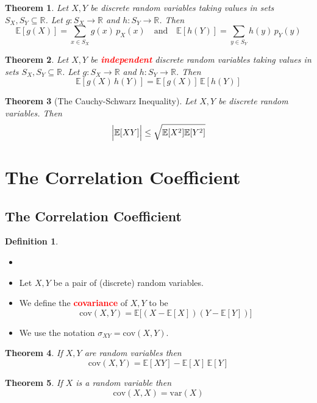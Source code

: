 \documentclass{article}
\newcommand{\R}{\mathbb{R}}
\newcommand{\E}{\mathbb{E}}
\newcommand{\var}{\text{var}}
\newcommand{\cov}{\text{cov}}
\newcommand{\bfred}[1]{\textcolor{red}{\textbf{#1}}}
\theoremstyle{plain}
\newtheorem{thm}{Theorem}[section]
\theoremstyle{definition}
\newtheorem{defn}{Definition}[section]
\theoremstyle{remark}
\begin{document}
\begin{thm}
    Let $X,Y$ be discrete random variables taking values in sets $S_X,S_Y\subseteq\R$. Let $g:S_X\rightarrow\R$ and $h:S_Y\rightarrow\R$. Then \[\E[g(X)]=\sum_{x\in S_X}g(x)\,p_X(x)\quad\text{and}\quad\E[h(Y)]=\sum_{y\in S_Y}h(y)\,p_Y(y)\]
\end{thm}

\begin{thm}
    Let $X,Y$ be \bfred{independent} discrete random variables taking values in sets $S_X,S_Y\subseteq\R$. Let $g:S_X\rightarrow\R$ and $h:S_Y\rightarrow\R$. Then \[\E[g(X)\,h(Y)]=\E[g(X)]\,\E[h(Y)]\]
\end{thm}

\begin{thm}[The Cauchy-Schwarz Inequality]
    Let $X,Y$ be discrete random variables. Then \[\Bigr\lvert\E[XY]\Bigr\rvert\leq\sqrt{\E[X^2]\E[Y^2]\vphantom{\bigr\vert}}\]
\end{thm}

\section{The Correlation Coefficient}

\subsection{The Correlation Coefficient}

\begin{defn}
    \begin{itemize}
        \item []
        \item Let $X,Y$ be a pair of (discrete) random variables.
        \item We define the \bfred{covariance} of $X,Y$ to be \[\cov(X,Y)=\E\bigr[(X-\E[X])(Y-\E[Y])\bigr]\] 
        \item We use the notation $\sigma_{XY}=\cov(X,Y)$.
    \end{itemize}
\end{defn}

\begin{thm}
    If $X,Y$ are random variables then \[\cov(X,Y)=\E[XY]-\E[X]\,\E[Y]\]
\end{thm}

\begin{thm}
    If $X$ is a random variable then \[\cov(X,X)=\var(X)\]
\end{thm}
\end{document}

